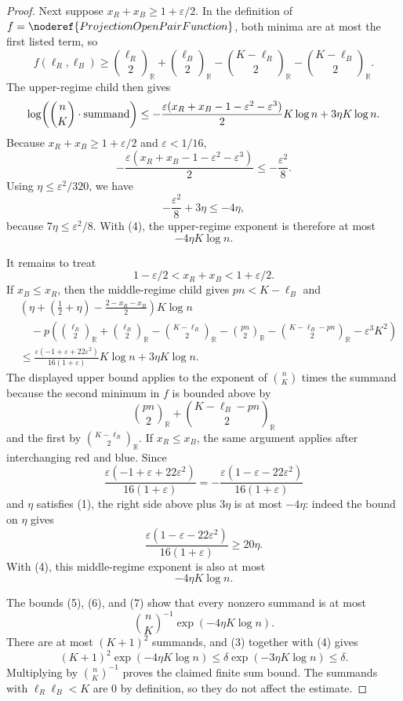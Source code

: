 \begin{proof}
Next suppose \(x_R+x_B\ge1+\varepsilon/2\).  In the definition of
\(f=\noderef{ProjectionOpenPairFunction}\), both minima are at most the first
listed term, so
\[
f(\ell_R,\ell_B)
\ge
\binom{\ell_R}{2}_{\mathbb R}+\binom{\ell_B}{2}_{\mathbb R}
-\binom{K-\ell_R}{2}_{\mathbb R}
-\binom{K-\ell_B}{2}_{\mathbb R}.
\]
The upper-regime child then gives
\[
\log\!\left(\binom nK\cdot\hbox{summand}\right)
\le
-\frac{\varepsilon(x_R+x_B-1-\varepsilon^2-\varepsilon^3)}{2}K\log n
+3\eta K\log n.
\]
Because \(x_R+x_B\ge1+\varepsilon/2\) and \(\varepsilon<1/16\),
\[
-\frac{\varepsilon(x_R+x_B-1-\varepsilon^2-\varepsilon^3)}{2}
\le -\frac{\varepsilon^2}{8}.
\]
Using \(\eta\le\varepsilon^2/320\), we have
\[
-\frac{\varepsilon^2}{8}+3\eta\le -4\eta,
\]
because \(7\eta\le\varepsilon^2/8\).  With (4), the upper-regime exponent is
therefore at most
\[
-4\eta K\log n. \tag{6}
\]

It remains to treat
\[
1-\varepsilon/2<x_R+x_B<1+\varepsilon/2.
\]
If \(x_B\le x_R\), then the middle-regime child gives \(pn<K-\ell_B\) and
\[
\begin{aligned}
&\left(\eta+\left(\frac12+\eta\right)-\frac{2-x_R-x_B}{2}\right)K\log n\\
&\quad
-p\left(
\binom{\ell_R}{2}_{\mathbb R}+\binom{\ell_B}{2}_{\mathbb R}
-\binom{K-\ell_R}{2}_{\mathbb R}
-\binom{pn}{2}_{\mathbb R}
-\binom{K-\ell_B-pn}{2}_{\mathbb R}
-\varepsilon^3K^2\right)\\
&\le
\frac{\varepsilon(-1+\varepsilon+22\varepsilon^2)}{16(1+\varepsilon)}
K\log n+3\eta K\log n.
\end{aligned}
\]
The displayed upper bound applies to the exponent of
\(\binom nK\) times the summand because the second minimum in \(f\) is bounded
above by
\[
\binom{pn}{2}_{\mathbb R}+\binom{K-\ell_B-pn}{2}_{\mathbb R}
\]
and the first by \(\binom{K-\ell_R}{2}_{\mathbb R}\).  If \(x_R\le x_B\), the
same argument applies after interchanging red and blue.  Since
\[
\frac{\varepsilon(-1+\varepsilon+22\varepsilon^2)}{16(1+\varepsilon)}
=-\frac{\varepsilon(1-\varepsilon-22\varepsilon^2)}{16(1+\varepsilon)}
\]
and \(\eta\) satisfies (1), the right side above plus \(3\eta\) is at most
\(-4\eta\): indeed the bound on \(\eta\) gives
\[
\frac{\varepsilon(1-\varepsilon-22\varepsilon^2)}{16(1+\varepsilon)}
\ge 20\eta.
\]
With (4), this middle-regime exponent is also at most
\[
-4\eta K\log n. \tag{7}
\]

The bounds (5), (6), and (7) show that every nonzero summand is at most
\[
\binom nK^{-1}\exp(-4\eta K\log n).
\]
There are at most \((K+1)^2\) summands, and (3) together with (4) gives
\[
(K+1)^2\exp(-4\eta K\log n)
\le
\delta\exp(-3\eta K\log n)
\le \delta.
\]
Multiplying by \(\binom nK^{-1}\) proves the claimed finite sum bound.  The
summands with \(\ell_R\ell_B<K\) are \(0\) by definition, so they do not affect
the estimate.
\end{proof}
